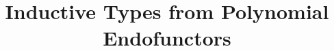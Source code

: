 \documentclass[acmsmall,screen]{acmart}
\begin{document}
\title{Inductive Types from Polynomial Endofunctors}

\maketitle







\clearpage
\appendix

\end{document}
